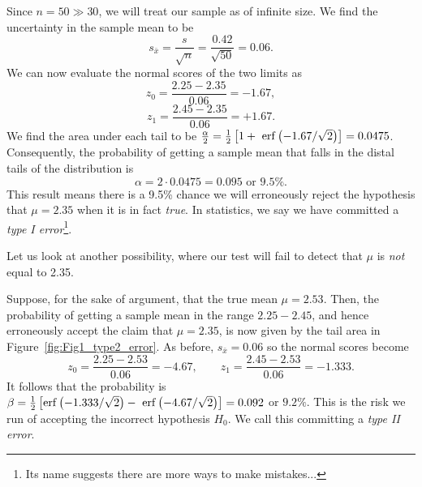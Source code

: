 \begin{example}
Since $n = 50 \gg 30$, we will treat our sample as of infinite size.  We find the uncertainty in the sample mean to be
\begin{equation}
s_{\bar{x}} = \frac{s}{\sqrt{n}} = \frac{0.42}{\sqrt{50}} = 0.06.	 
\end{equation}
We can now evaluate the normal scores of the two limits as
\begin{equation}
z_0 = \frac{2.25 - 2.35}{0.06} = -1.67,
\end{equation}
\begin{equation}
z_1 = \frac{2.45 - 2.35}{0.06} = + 1.67.
\end{equation}
We find the area under each tail to be $\frac{\alpha}{2} = \frac{1}{2} \left[ 1 + \ \operatorname{erf} \left ( -1.67 / \sqrt{2}\right) \right] = 0.0475$.
Consequently, the probability of getting a sample 
mean that falls in the distal tails of the distribution is
\begin{equation}
\alpha = 2 \cdot 0.0475 = 0.095 \mbox{ or } 9.5\%.
\end{equation}	 
This result means there is a 9.5\% chance we will erroneously reject the hypothesis that $\mu = 2.35$ 
when it is in fact \emph{true}.  In statistics, we say we have committed a
\emph{type I error}\footnote{Its name suggests there are more ways to make mistakes...}.
\end{example}


	Let us look at another possibility, where our test will fail to detect that $\mu$ is \emph{not} equal to 2.35.
\begin{example}
Suppose, for the sake of argument, that the true mean $\mu = 2.53$.  Then, the probability of getting a 
sample mean in the range $2.25 - 2.45$, and hence erroneously accept the claim that $\mu = 2.35$, is 
now given by the tail area in Figure~\ref{fig:Fig1_type2_error}.
 As before, $s_{\bar{x}} = 0.06$ so the normal scores become
\begin{equation}
z_0 = \frac{2.25 - 2.53}{0.06} = -4.67, \quad \quad z_1 = \frac{2.45-2.53}{0.06} = -1.333.
\end{equation}	           
It follows that the probability is $\beta = \frac{1}{2} \left[ \operatorname{erf}\left( -1.333 / \sqrt{2} \right)- \ \operatorname{erf} \left( -4.67/ \sqrt{2} \right) \right ]   = 0.092$ or $9.2\%$.
This is the risk we run of accepting the incorrect hypothesis $H_0$.  We call this committing a \emph{type II error}.
\end{example}

